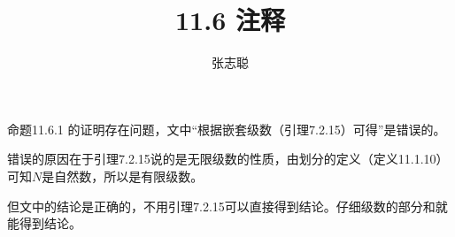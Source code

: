 \documentclass{article}
\begin{document}
\title{11.6 注释}
\author{张志聪}
\maketitle

\begin{zremark}
  命题11.6.1 的证明存在问题，文中“根据嵌套级数（引理7.2.15）可得”是错误的。
\end{zremark}

错误的原因在于引理7.2.15说的是无限级数的性质，由划分的定义（定义11.1.10）
可知$N$是自然数，所以是有限级数。

但文中的结论是正确的，不用引理7.2.15可以直接得到结论。仔细级数的部分和就能得到结论。
\end{document}
